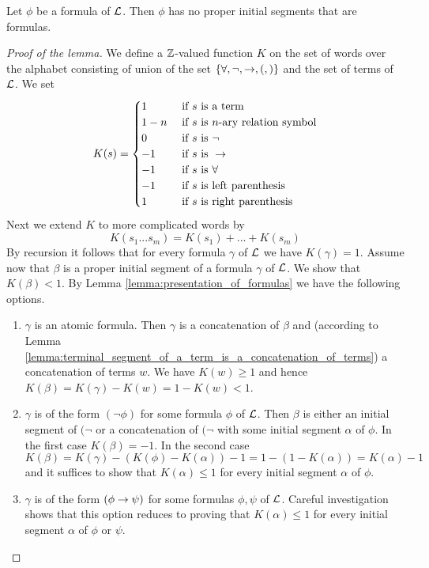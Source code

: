 \begin{lemma}\label{lemma:no_formula_is_a_proper_initial_segment_of_any_other_formula}
Let $\phi$ be a formula of ${\mathcal L}$. Then $\phi$ has no proper initial segments that are formulas.
\end{lemma}
\begin{proof}[Proof of the lemma]
We define a ${\mathbb Z}$-valued function $K$ on the set of words over the alphabet consisting of union of the set $\{\forall, \neg, \rightarrow, (,)\}$ and the set of terms of ${\mathcal L}$. We set
$$K(s) = \begin{cases}
1 & \mbox{ if }s\mbox{ is a term}\\
1-n & \mbox{ if }s\mbox{ is $n$-ary relation symbol}\\
0 & \mbox{ if }s\mbox{ is }\neg\\
-1 & \mbox{ if }s\mbox{ is }\rightarrow\\
-1 & \mbox{ if }s\mbox{ is }\forall\\
-1 & \mbox{ if }s\mbox{ is left parenthesis}\\
1 & \mbox{ if }s\mbox{ is right parenthesis}\\
\end{cases}$$
Next we extend $K$ to more complicated words by
$$K(s_1...s_m) = K(s_1) +...+ K(s_m)$$
By recursion it follows that for every formula $\gamma$ of ${\mathcal L}$ we have $K(\gamma) = 1$. Assume now that $\beta$ is a proper initial segment of a formula $\gamma$ of ${\mathcal L}$. We show that $K(\beta) < 1$. By Lemma \ref{lemma:presentation_of_formulas} we have the following options.
\begin{enumerate}[label=\textbf{(\arabic*)}, leftmargin=3.0em]
\item $\gamma$ is an atomic formula. Then $\gamma$ is a concatenation of $\beta$ and (according to Lemma \ref{lemma:terminal_segment_of_a_term_is_a_concatenation_of_terms}) a concatenation of terms $w$. We have $K(w) \geq 1$ and hence $K(\beta) = K(\gamma)- K(w) = 1 - K(w) < 1$.
\item $\gamma$ is of the form $(\neg \phi)$ for some formula $\phi$ of ${\mathcal L}$. Then $\beta$ is either an initial segment of $(\neg$ or a concatenation of $(\neg$ with some initial segment $\alpha$ of $\phi$. In the first case $K(\beta) = -1$. In the second case $K(\beta) = K(\gamma) - (K(\phi) - K(\alpha)) -1 = 1 - (1 - K(\alpha)) = K(\alpha)-1$ and it suffices to show that $K(\alpha) \leq 1$ for every initial segment $\alpha$ of $\phi$.
\item $\gamma$ is of the form $(\phi \rightarrow \psi)$ for some formulas $\phi, \psi$ of ${\mathcal L}$. Careful investigation shows that this option reduces to proving that $K(\alpha) \leq 1$ for every initial segment $\alpha$ of $\phi$ or $\psi$.

\end{enumerate}
\end{proof}

